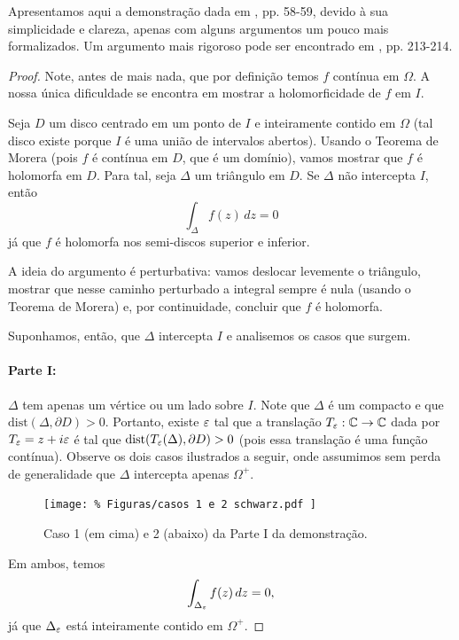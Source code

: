     Apresentamos aqui a demonstração dada em \cite{MR1976398}, pp. 58-59, 
    devido à sua simplicidade e clareza, apenas com alguns argumentos um pouco mais
    formalizados. Um argumento mais rigoroso pode ser encontrado em \cite{MR503901}, pp. 213-214.
    
    \begin{proof}
        Note, antes de mais nada, que por definição temos $f$ contínua em $\Omega$.
        A nossa única dificuldade se encontra em mostrar a holomorficidade de $f$ em $I$.
        
        Seja $D$ um disco centrado em um ponto de $I$ e inteiramente contido em $\Omega$
        (tal disco existe porque $I$ é uma união de intervalos abertos).
        Usando o Teorema de Morera (pois $f$ é contínua em $D$, que é um domínio), 
        vamos mostrar que $f$ é holomorfa em $D$. Para tal,
        seja $\Delta$ um triângulo em $D$. Se $\Delta$ não intercepta $I$, então
        \begin{equation*}
            \int_{\Delta} f(z) \, dz = 0
        \end{equation*}
        já que $f$ é holomorfa nos semi-discos superior e inferior.
        
        A ideia do argumento é perturbativa: vamos deslocar levemente o triângulo,
        mostrar que nesse caminho perturbado a integral sempre é nula 
        (usando o Teorema de Morera) e, por continuidade, concluir que $f$ é holomorfa.
        
        Suponhamos, então, que $\Delta$ intercepta $I$ e analisemos os casos que surgem.
        \paragraph{Parte I:} $\Delta$ tem apenas um vértice ou um lado sobre $I$. 
        Note que $\Delta$ é um compacto e que $\text{dist}(\Delta, \partial D) > 0$.
        Portanto, existe $\varepsilon$ tal que a translação $T_{\varepsilon}:\mathbb{C}\to\mathbb{C}$
        dada por $T_{\varepsilon} = z + i\varepsilon$ é tal que 
        $\text{dist}(T_{\varepsilon}(\Delta), \partial D) > 0$ (pois essa translação
        é uma função contínua). Observe os dois casos ilustrados a seguir, onde assumimos
        sem perda de generalidade que $\Delta$ intercepta apenas $\Omega^+$.
        \begin{figure}[H]\centering
            \texttt{[image: \%
                Figuras/casos 1 e 2 schwarz.pdf
            ]}
            \caption{Caso 1 (em cima) e 2 (abaixo) da Parte I da demonstração.}
        \end{figure}
        Em ambos, temos
        \begin{equation*}
            \int_{\Delta_{\varepsilon}} f(z)\, dz = 0,
        \end{equation*}
        já que $\Delta_{\varepsilon}$ está inteiramente contido em $\Omega^+$.
        

\end{proof}
